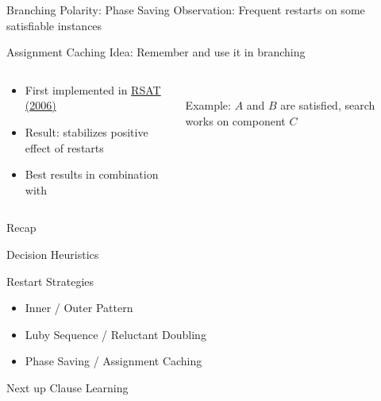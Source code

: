 \documentclass[t]{sdqbeamer}
\begin{document}
		
\begin{frame}{Branching Polarity: Phase Saving}
Observation: Frequent {restarts}  on some satisfiable instances\\[1em]
\begin{block}{Assignment Caching}
Idea: Remember  and use it  in branching
\begin{columns}[T]
\begin{column}{0.55\textwidth}
\begin{itemize}\setlength{\itemsep}{1em}
	\item First implemented in \href{http://reasoning.cs.ucla.edu/rsat/}{RSAT (2006)}
	\item Result:  stabilizes positive effect of restarts
	\item Best results in combination with 
\end{itemize}
\end{column}
\begin{column}{0.4\textwidth}
\centering
{}~\\
Example: $A$ and $B$ are satisfied, search works on component $C$
\end{column}
\end{columns}
\end{block}
\end{frame}

\begin{frame}{Recap}
	\begin{block}{Decision Heuristics}
	\end{block}
	\begin{block}{Restart Strategies}
		\begin{itemize}\setlength{\itemsep}{1ex}
			\item Inner / Outer Pattern
			\item Luby Sequence / Reluctant Doubling
			\item Phase Saving / Assignment Caching
		\end{itemize}
	\end{block}
	\begin{block}{Next up}
		Clause Learning
	\end{block}
\end{frame}
\end{document}
